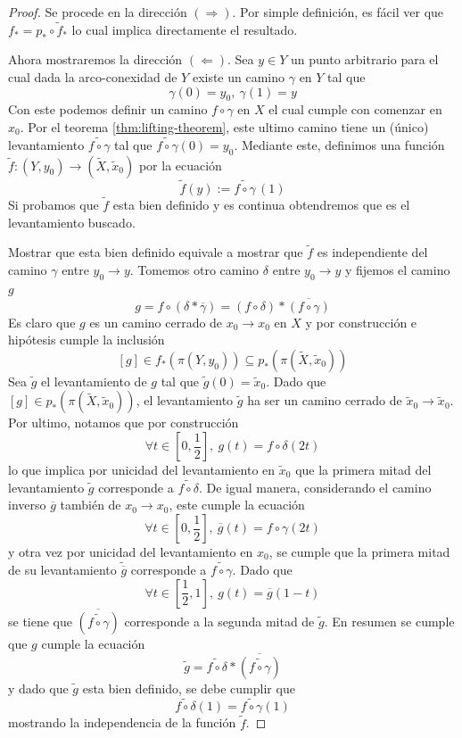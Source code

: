 \begin{proof}
  Se procede en la dirección \((\Rightarrow)\). Por simple definición,
  es fácil ver que \(f_* = p_* \circ \tilde f _*\) lo cual implica
  directamente el resultado.

  Ahora mostraremos la dirección \((\Leftarrow)\). Sea \(y \in Y\) un
  punto arbitrario para el cual dada la arco-conexidad de \(Y\) existe
  un camino \(\gamma\) en \(Y\) tal que
  \[\gamma (0) = y_0,\ \gamma (1) = y\]
  Con este podemos definir un camino \(f \circ \gamma\) en \(X\) el cual
  cumple con comenzar en \(x_0\). Por el teorema
  \ref{thm:lifting-theorem}, este ultimo camino tiene un (único)
  levantamiento \(\widetilde {f \circ \gamma}\) tal que \(\widetilde{f
  \circ \gamma} (0) = y_0 \). Mediante este, definimos una función
  \(\tilde f : (Y, y_0) \to (\tilde X , \tilde x_0)\) por la ecuación
  \begin{equation} \label{def:f-tilda}
    \tilde f (y) := \widetilde{f \circ \gamma} \, (1)
  \end{equation}
  Si probamos que \(\tilde f\) esta bien definido y es continua
  obtendremos que es el levantamiento buscado.

  Mostrar que esta bien definido equivale a mostrar que \(\tilde f\) es
  independiente del camino \(\gamma\) entre \(y_0 \to y\). Tomemos otro
  camino \(\delta\) entre \(y_0 \to y\) y fijemos el camino \(g\)
  \[ g = f \circ \left( \delta * \overline{\gamma} \right)
    = (f \circ \delta) * \overline{(f \circ \gamma)} \]
  Es claro que \(g\) es un camino cerrado de \(x_0 \to x_0\) en \(X\)
  y por construcción e hipótesis cumple la inclusión
  \[ [g] \in f_* \left( \pi (Y, y_0) \right) \subseteq p_* \left( \pi
      (\tilde X, \tilde x_0) \right)\]
  Sea \(\tilde g\) el levantamiento de \(g\) tal que \(\tilde g
  (0) = \tilde x_0\). Dado que \([g] \in p_* \left( \pi (\tilde X
    ,\tilde x_0) \right)\), el levantamiento \(\tilde g\) ha ser un
  camino cerrado de \(\tilde x_0 \to \tilde x_0\). Por ultimo, notamos
  que por construcción
  \[ \forall t \in [0, \frac 1 2],\ g(t) = f \circ \delta (2 t) \]
  lo que implica por unicidad del levantamiento en \(\tilde x_0\) que la
  primera mitad del levantamiento \(\tilde g\) corresponde a
  \(\widetilde{f \circ \delta}\). De igual manera, considerando el
  camino inverso \(\overline{g}\) también de \(x_0 \to x_0\), este
  cumple la ecuación
  \[ \forall t \in [0, \frac 1 2],\ \overline{g}(t) = f \circ \gamma (2
    t) \]
  y otra vez por unicidad del levantamiento en \(x_0\), se cumple que la
  primera mitad de su levantamiento \(\widetilde{\overline{g}}\)
  corresponde a \(\widetilde{f \circ \gamma}\). Dado que
  \[ \forall t \in [\frac 1 2 , 1],\ g(t) = \overline{g} (1 - t) \]
  se tiene que \(\overline{(\widetilde{f \circ \gamma})}\) corresponde a la
  segunda mitad de \(\tilde g\). En resumen se cumple que \(g\) cumple
  la ecuación
  \[ \tilde g = \widetilde{f \circ \delta} * \overline{(\widetilde{f
  \circ \gamma})} \] y dado que \(\tilde g\) esta bien definido, se debe
  cumplir que
  \[ \widetilde{f \circ \delta} (1) = \widetilde{f \circ \gamma} (1) \]
  mostrando la independencia de la función \(\tilde f\).


\end{proof}

